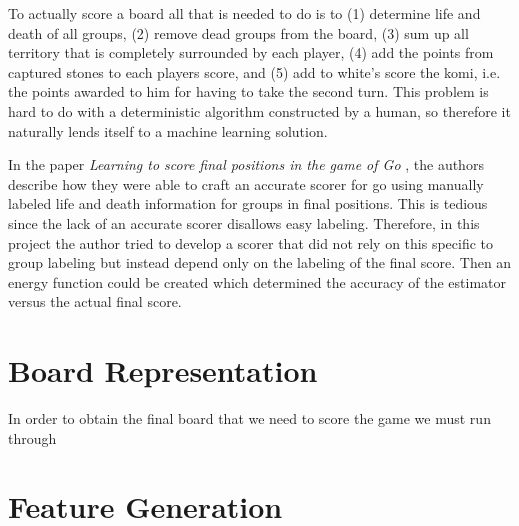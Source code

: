 \documentclass[11pt,letterpaper]{article}
\begin{document}
To actually score a board all that is needed to do is to (1) determine life and death of all groups, (2) remove dead groups from
the board, (3) sum up all territory that is completely surrounded by each player, (4) add the points from captured stones to each
players score, and (5) add to white's score the komi, i.e. the points awarded to him for having to take the second turn. This
problem is hard to do with a deterministic algorithm constructed by a human, so therefore it naturally lends itself to a machine
learning solution.

In the paper \emph{Learning to score final positions in the game of Go} \cite{vdW:04}, the authors describe how they were able
to craft an accurate scorer for go using manually labeled life and death information for groups in final positions. This is tedious
since the lack of an accurate scorer disallows easy labeling. Therefore, in this project the author tried to develop a scorer that
did not rely on this specific to group labeling but instead depend only on the labeling of the final score. Then an energy function
could be created which determined the accuracy of the estimator versus the actual final score.

\section{Board Representation}

In order to obtain the final board that we need to score the game we must run through 

\section{Feature Generation}
\end{document}
